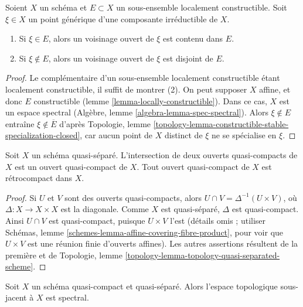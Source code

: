 \begin{lemma}
\label{lemma-generic-point-in-constructible}
Soient $X$ un schéma et $E \subset X$ un sous-ensemble localement constructible.
Soit $\xi \in X$ un point générique d'une composante irréductible de $X$.
\begin{enumerate}
\item Si $\xi \in E$, alors un voisinage ouvert de
$\xi$ est contenu dans $E$.
\item Si $\xi \not \in E$, alors un voisinage ouvert
de $\xi$ est disjoint de $E$.
\end{enumerate}
\end{lemma}

\begin{proof}
Le complémentaire d'un sous-ensemble localement constructible étant
localement constructible, il suffit de montrer (2). On peut supposer $X$ affine,
et donc $E$ constructible (lemme \ref{lemma-locally-constructible}).
Dans ce cas, $X$ est un espace
spectral (Algèbre, lemme \ref{algebra-lemma-spec-spectral}).
Alors $\xi \not \in E$ entraîne $\xi \not \in \overline{E}$ d'après
Topologie, lemme \ref{topology-lemma-constructible-stable-specialization-closed},
car aucun point de $X$ distinct de $\xi$
ne se spécialise en $\xi$.
\end{proof}

\begin{lemma}
\label{lemma-quasi-separated-quasi-compact-open-retrocompact}
Soit $X$ un schéma quasi-séparé. L'intersection de deux
ouverts quasi-compacts de $X$ est un ouvert quasi-compact de $X$.
Tout ouvert quasi-compact de $X$ est rétrocompact dans $X$.
\end{lemma}

\begin{proof}
Si $U$ et $V$ sont des ouverts quasi-compacts, alors
$U \cap V = \Delta^{-1}(U \times V)$, où $\Delta : X \to X \times X$
est la diagonale. Comme $X$ est quasi-séparé, $\Delta$ est
quasi-compact. Ainsi $U \cap V$ est quasi-compact, puisque
$U \times V$ l'est (détails omis ; utiliser
Schémas, lemme \ref{schemes-lemma-affine-covering-fibre-product},
pour voir que $U \times V$ est une réunion finie d'ouverts
affines). Les autres assertions résultent de la première et
de Topologie, lemme \ref{topology-lemma-topology-quasi-separated-scheme}.
\end{proof}

\begin{lemma}
\label{lemma-quasi-compact-quasi-separated-spectral}
Soit $X$ un schéma quasi-compact et quasi-séparé.
Alors l'espace topologique sous-jacent à $X$ est spectral.
\end{lemma}


